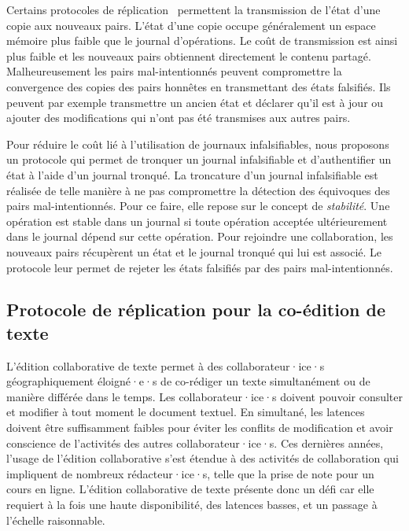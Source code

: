Certains protocoles de réplication~\autocite{feldman2010sporc,almeida_2018_delta-crdt-revisited} permettent la transmission de l'état d'une copie aux nouveaux pairs.
L'état d'une copie occupe généralement un espace mémoire plus faible que le journal d'opérations.
Le coût de transmission est ainsi plus faible et les nouveaux pairs obtiennent directement le contenu partagé.
Malheureusement les pairs mal-intentionnés peuvent compromettre la convergence des copies des pairs honnêtes en transmettant des états falsifiés.
Ils peuvent par exemple transmettre un ancien état et déclarer qu'il est à jour ou ajouter des modifications qui n'ont pas été transmises aux autres pairs.

Pour réduire le coût lié à l'utilisation de journaux infalsifiables, nous proposons un protocole qui permet de tronquer un journal infalsifiable et d'authentifier un état à l'aide d'un journal tronqué.
La troncature d'un journal infalsifiable est réalisée de telle manière à ne pas compromettre la détection des équivoques des pairs mal-intentionnés.
Pour ce faire, elle repose sur le concept de \emph{stabilité}.
Une opération est stable dans un journal si toute opération acceptée ultérieurement dans le journal dépend sur cette opération.
Pour rejoindre une collaboration, les nouveaux pairs récupèrent un état et le journal tronqué qui lui est associé.
Le protocole leur permet de rejeter les états falsifiés par des pairs mal-intentionnés.


\subsection{Protocole de réplication pour la co-édition de texte}


L'édition collaborative de texte permet à des collaborateur·ice·s géographiquement éloigné·e·s de co-rédiger un texte simultanément ou de manière différée dans le temps.
Les collaborateur·ice·s doivent pouvoir consulter et modifier à tout moment le document textuel.
En simultané, les latences doivent être suffisamment faibles pour éviter les conflits de modification et avoir conscience de l'activités des autres collaborateur·ice·s.
Ces dernières années, l'usage de l'édition collaborative s'est étendue à des activités de collaboration qui impliquent de nombreux rédacteur·ice·s, telle que la prise de note pour un cours en ligne.
L'édition collaborative de texte présente donc un défi car elle requiert à la fois une haute disponibilité, des latences basses, et un passage à l'échelle raisonnable.

